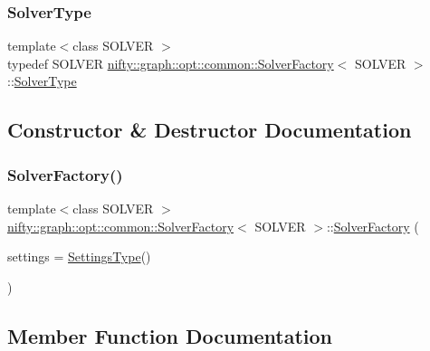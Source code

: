 \subsubsection{\texorpdfstring{Solver\+Type}{SolverType}}
{\footnotesize\ttfamily template$<$class S\+O\+L\+V\+ER $>$ \\
typedef S\+O\+L\+V\+ER \hyperlink{classnifty_1_1graph_1_1opt_1_1common_1_1SolverFactory}{nifty\+::graph\+::opt\+::common\+::\+Solver\+Factory}$<$ S\+O\+L\+V\+ER $>$\+::\hyperlink{classnifty_1_1graph_1_1opt_1_1common_1_1SolverFactory_a26ff0b82a74762acc2d96f4304beff2f}{Solver\+Type}}



\subsection{Constructor \& Destructor Documentation}
\mbox{\label{classnifty_1_1graph_1_1opt_1_1common_1_1SolverFactory_a244c7fbacf20d01edf4c9cdd9f363700}} 
\subsubsection{\texorpdfstring{Solver\+Factory()}{SolverFactory()}}
{\footnotesize\ttfamily template$<$class S\+O\+L\+V\+ER $>$ \\
\hyperlink{classnifty_1_1graph_1_1opt_1_1common_1_1SolverFactory}{nifty\+::graph\+::opt\+::common\+::\+Solver\+Factory}$<$ S\+O\+L\+V\+ER $>$\+::\hyperlink{classnifty_1_1graph_1_1opt_1_1common_1_1SolverFactory}{Solver\+Factory} (\begin{DoxyParamCaption}\item[{const \hyperlink{classnifty_1_1graph_1_1opt_1_1common_1_1SolverFactory_a446fddb741fd543837d9dc8e04ecb10e}{Settings\+Type} \&}]{settings = {\ttfamily \hyperlink{classnifty_1_1graph_1_1opt_1_1common_1_1SolverFactory_a446fddb741fd543837d9dc8e04ecb10e}{Settings\+Type}()} }\end{DoxyParamCaption})\hspace{0.3cm}{\ttfamily [inline]}}



\subsection{Member Function Documentation}
\mbox{\label{classnifty_1_1graph_1_1opt_1_1common_1_1SolverFactory_a6183e1800d9d7c82de7cac0b5297a42f}} 
